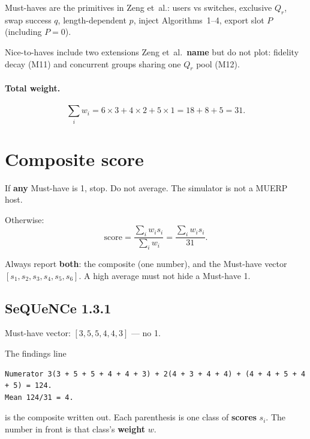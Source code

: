 \documentclass[11pt]{article}
\begin{document}
Must-haves are the primitives in Zeng et~al.: users vs switches, exclusive $Q_r$, swap success $q$, length-dependent $p$, inject Algorithms~1--4, export slot $P$ (including $P=0$).

Nice-to-haves include two extensions Zeng et~al.\ \textbf{name} but do not plot: fidelity decay (M11) and concurrent groups sharing one $Q_r$ pool (M12).

\paragraph{Total weight.}
\begin{equation}
\sum_i w_i = 6\times 3 + 4\times 2 + 5\times 1 = 18 + 8 + 5 = 31.
\end{equation}

\section{Composite score}

If \textbf{any} Must-have is 1, stop. Do not average. The simulator is not a MUERP host.

Otherwise:
\begin{equation}
\mathrm{score} = \frac{\sum_i w_i s_i}{\sum_i w_i} = \frac{\sum_i w_i s_i}{31}.
\end{equation}

Always report \textbf{both}: the composite (one number), and the Must-have vector $[s_1,s_2,s_3,s_4,s_5,s_6]$.
A high average must not hide a Must-have 1.

\subsection{SeQUeNCe 1.3.1}

Must-have vector: $[3,5,5,4,4,3]$ --- no 1.

The findings line
\begin{verbatim}
Numerator 3(3 + 5 + 5 + 4 + 4 + 3) + 2(4 + 3 + 4 + 4) + (4 + 4 + 5 + 4 + 5) = 124.
Mean 124/31 = 4.
\end{verbatim}
is the composite written out.
Each parenthesis is one class of \textbf{scores} $s_i$.
The number in front is that class's \textbf{weight} $w$.
\end{document}
